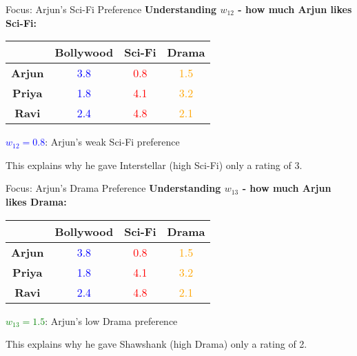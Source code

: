 \documentclass{beamer}
\begin{document}
\begin{frame}{Focus: Arjun's Sci-Fi Preference}
\textbf{Understanding $w_{12}$ - how much Arjun likes Sci-Fi:}

\pause
\begin{center}
\renewcommand{\arraystretch}{1.6}
\begin{tabular}{c|ccc}
 & \textbf{Bollywood} & \textbf{Sci-Fi} & \textbf{Drama} \\
\hline
\textbf{Arjun} & \textcolor{blue}{3.8} & \cellcolor{blue!50}\textcolor{red}{0.8} & \textcolor{orange}{1.5} \\
\textbf{Priya} & \textcolor{blue}{1.8} & \textcolor{red}{4.1} & \textcolor{orange}{3.2} \\
\textbf{Ravi} & \textcolor{blue}{2.4} & \textcolor{red}{4.8} & \textcolor{orange}{2.1}
\end{tabular}
\end{center}

\pause
\textcolor{blue}{\textbf{$w_{12} = 0.8$}}: Arjun's weak Sci-Fi preference

\pause
This explains why he gave Interstellar (high Sci-Fi) only a rating of 3.
\end{frame}

\begin{frame}{Focus: Arjun's Drama Preference}
\textbf{Understanding $w_{13}$ - how much Arjun likes Drama:}

\pause
\begin{center}
\renewcommand{\arraystretch}{1.6}
\begin{tabular}{c|ccc}
 & \textbf{Bollywood} & \textbf{Sci-Fi} & \textbf{Drama} \\
\hline
\textbf{Arjun} & \textcolor{blue}{3.8} & \textcolor{red}{0.8} & \cellcolor{green!50}\textcolor{orange}{1.5} \\
\textbf{Priya} & \textcolor{blue}{1.8} & \textcolor{red}{4.1} & \textcolor{orange}{3.2} \\
\textbf{Ravi} & \textcolor{blue}{2.4} & \textcolor{red}{4.8} & \textcolor{orange}{2.1}
\end{tabular}
\end{center}

\pause
\textcolor{green}{\textbf{$w_{13} = 1.5$}}: Arjun's low Drama preference

\pause
This explains why he gave Shawshank (high Drama) only a rating of 2.
\end{frame}
\end{document}
